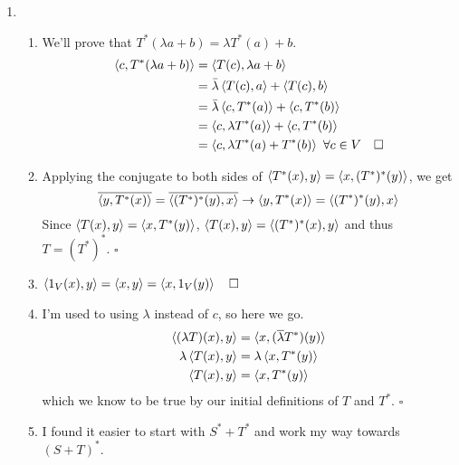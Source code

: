 \documentclass[12pt]{article}
\begin{document}
\begin{enumerate}
      \item \begin{enumerate}
                  \item We'll prove that $T^*(\lambda a+b)=\lambda T^*(a)+b$.
                        \begin{align*}
                              \braket{c, T^*(\lambda a + b)}
                               & = \braket{T(c), \lambda a+b}                                     \\
                               & = \bar{\lambda}\braket{T(c), a}+\braket{T(c), b}                 \\
                               & = \bar{\lambda}\braket{c, T^*(a)}+\braket{c, T^*(b)}             \\
                               & = \braket{c, \lambda T^*(a)}+\braket{c, T^*(b)}                  \\
                               & = \braket{c, \lambda T^*(a)+T^*(b)}\ \forall c \in V\quad\square
                        \end{align*}
                  \item Applying the conjugate to both sides of
                        $\braket{T^*(x), y}=\braket{x, (T^*)^*(y)}$, we get
                        \[\overline{\braket{y, T^*(x)}}=\overline{\braket{(T^*)^*(y), x}}
                              \rightarrow \braket{y, T^*(x)}=\braket{(T^*)^*(y), x}\]
                        Since $\braket{T(x), y}=\braket{x, T^*(y)}$,
                        $\braket{T(x),y}=\braket{(T^*)^*(x), y}$ and thus $T=(T^*)^*$. $\square$
                  \item $\braket{\mathrm{1}_V(x), y}=\braket{x, y}=\braket{x, \mathrm{1}_V(y)}\quad\square$
                  \item I'm used to using $\lambda$ instead of $c$, so here we go.
                        \begin{gather*}
                              \braket{(\lambda T)(x), y} = \braket{x, (\overline{\lambda} T^*)(y)} \\
                              \lambda \braket{T(x), y}= \lambda \braket{x, T^*(y)} \\
                              \braket{T(x), y}= \braket{x, T^*(y)}
                        \end{gather*}
                        which we know to be true by our initial definitions of $T$ and $T^*$. $\square$
                  \item I found it easier to start with $S^*+T^*$ and work my way towards $(S+T)^*$.

\end{enumerate}
\end{enumerate}
\end{document}
